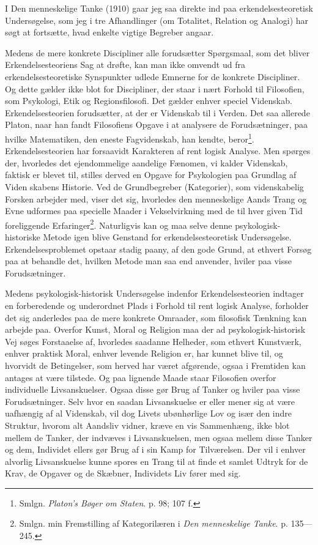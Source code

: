 \documentclass[12pt]{article}
\newcommand{\opage}[1]{\marginnote{\footnotesize\textit{[#1]}}}
\begin{document}
I \guillemotright{}Den menneskelige Tanke\guillemotleft{} (1910) gaar jeg saa direkte ind paa
erkendelsesteoretisk Undersøgelse, som jeg i tre Afhandlinger (om
Totalitet, Relation og Analogi) har søgt at fortsætte, hvad enkelte
vigtige Begreber angaar.

Medens de mere konkrete Discipliner alle forudsætter Spørgsmaal, som
det bliver Erkendelsesteoriens Sag at drøfte, kan man ikke omvendt ud
fra erkendelsesteoretiske Synspunkter udlede Emnerne for de konkrete
Discipliner. Og dette gælder ikke blot for Discipliner, der staar i
nært Forhold til Filosofien, som Psykologi, Etik og
Regionsfilosofi. Det gælder enhver speciel Videnskab.
Erkendelsesteorien forudsætter, at der er Videnskab til i Verden. Det
saa allerede Platon, naar han fandt Filosofiens Opgave i at analysere
de Forudsætninger, paa hvilke Matematiken, den eneste Fagvidenskab,
han kendte, beror\footnote{Smlgn. \textit{Platon's Bøger om Staten}.
p. 98; 107 f.}. Erkendelsesteorien har forsaavidt Karakteren af rent
logisk Analyse. Men spørges der, hvorledes det ejendommelige aandelige
Fænomen, vi kalder Videnskab, faktisk er blevet til, stilles derved en
Opgave for Psykologien paa Grundlag af Viden%
\setcounter{footnote}{0}%
\opage{7}skabens Historie. Ved de Grundbegreber (Kategorier), som
videnskabelig Forsken arbejder med, viser det sig, hvorledes den
menneskelige Aands Trang og Evne udformes paa specielle Maader i
Vekselvirkning med de til hver given Tid foreliggende
Erfaringer\footnote{Smlgn. min Fremstilling af Kategorilæren i
\textit{Den menneskelige Tanke}. p. 135---245.}. Naturligvis kan og
maa selve denne psykologisk-historiske Metode igen blive Genstand for
erkendelsesteoretisk Undersøgelse. Erkendelsesproblemet opstaar stadig
paany, af den gode Grund, at ethvert Forsøg paa at behandle det,
hvilken Metode man saa end anvender, hviler paa visse Forudsætninger.

Medens psykologisk-historisk Undersøgelse indenfor Erkendelsesteorien
indtager en forberedende og underordnet Plads i Forhold til rent
logisk Analyse, forholder det sig anderledes paa de mere konkrete
Omraader, som filosofisk Tænkning kan arbejde paa. Overfor Kunst,
Moral og Religion maa der ad psykologisk-historisk Vej søges
Forstaaelse af, hvorledes saadanne Helheder, som ethvert Kunstværk,
enhver praktisk Moral, enhver levende Religion er, har kunnet blive
til, og hvorvidt de Betingelser, som herved har været afgørende, ogsaa
i Fremtiden kan antages at være tilstede. Og paa lignende Maade staar
Filosofien overfor individuelle Livsanskuelser. Ogsaa disse gør Brug
af Tanker og hviler paa visse Forudsætninger. Selv hvor en saadan
Livsanskuelse er eller mener sig at være uafhængig af al Videnskab,
vil dog Livets ubønhørlige Lov og især den indre Struktur, hvorom alt
Aandsliv vidner, kræve en vis Sammenhæng, ikke blot mellem de Tanker,
der indvæves i Livsanskuelsen, men ogsaa mellem disse Tanker og dem,
Individet ellers gør Brug af i sin Kamp for Tilværelsen. Der vil i
enhver alvorlig Livsanskuelse kunne
\opage{8}spores en Trang til at finde et samlet Udtryk for de Krav, de
Opgaver og de Skæbner, Individets Liv fører med sig.
\end{document}
